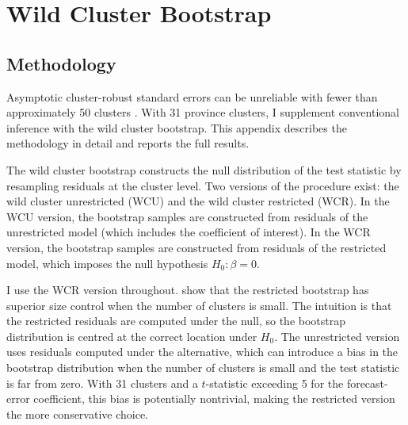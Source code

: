 
\section{Wild Cluster Bootstrap}\label{app:bootstrap}

\subsection{Methodology}

Asymptotic cluster-robust standard errors can be unreliable
with fewer than approximately 50 clusters
\citep{Cameron2008, MacKinnon2017}.
With 31 province clusters, I supplement conventional inference
with the wild cluster bootstrap.
This appendix describes the methodology in detail and reports
the full results.

The wild cluster bootstrap constructs the null distribution of
the test statistic by resampling residuals at the cluster level.
Two versions of the procedure exist: the wild cluster
unrestricted (WCU) and the wild cluster restricted (WCR).
In the WCU version, the bootstrap samples are constructed
from residuals of the unrestricted model (which includes the
coefficient of interest).
In the WCR version, the bootstrap samples are constructed
from residuals of the restricted model, which imposes the
null hypothesis $H_0\colon \beta = 0$.

I use the WCR version throughout.
\citet{MacKinnon2017} show that the restricted bootstrap
has superior size control when the number of clusters is
small.
The intuition is that the restricted residuals are computed
under the null, so the bootstrap distribution is centred at
the correct location under $H_0$.
The unrestricted version uses residuals computed under the
alternative, which can introduce a bias in the bootstrap
distribution when the number of clusters is small and the
test statistic is far from zero.
With 31 clusters and a $t$-statistic exceeding 5 for the
forecast-error coefficient, this bias is potentially
nontrivial, making the restricted version the more
conservative choice.

